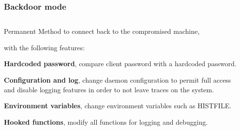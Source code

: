 \begin{frame}
	\frametitle{Backdoor mode}
	
	\centering
	
  \begin{columns}
  \begin{column}{0.6\textwidth}
	Permanent Method to connect back to the compromised machine, 
	
	\medskip

	with the following features:

	\smallskip

  \textbf{Hardcoded password}, compare client password with a hardcoded password.

  \smallskip

  \textbf{Configuration and log}, change daemon configuration to permit full access and disable logging features in order to not leave traces on the system.

  \smallskip

  \textbf{Environment variables}, change environment variables such as \textsc{HISTFILE}.

  \smallskip

  \textbf{Hooked functions}, modify all functions for logging and debugging.

  \end{column}
  \begin{column}{0.35\textwidth}
      \begin{center}
      

\end{center}
\end{column}
\end{columns}
\end{frame}
